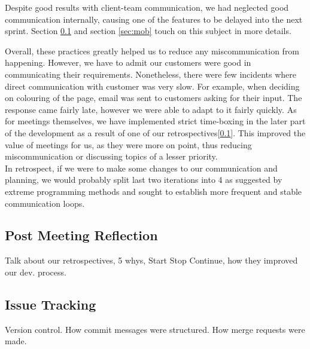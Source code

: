 \documentclass{l3proj}
\begin{document}
        \newline
        \newline
        Despite good results with client-team communication, we had neglected good communication internally, causing one of the features to be delayed into the next sprint. Section \ref{rec:retrospectives} and section \ref{sec:mob} touch on this subject in more details.
        
        \newline
        \newline
        Overall, these practices greatly helped us to reduce any miscommunication from happening. However, we have to admit  our customers were good in communicating their requirements. Nonetheless, there were few incidents where direct communication with customer was very slow. For example, when deciding on colouring of the page, email was sent to customers asking for their input. The response came fairly late, however we were able to adapt to it fairly quickly. As for meetings themselves, we have implemented strict time-boxing in the later part of the development as a result of one of our retrospectives[\ref{rec:retrospectives}]. This improved the value of meetings for us, as they were more on point, thus reducing miscommunication or discussing topics of a lesser priority.\\
        In retrospect, if we were to make some changes to our communication and planning, we would probably split last two iterations into 4 as suggested by extreme programming methods\cite{ep} and sought to establish more frequent and stable communication loops.
        
        
    \subsection{Post Meeting Reflection}
    \label{rec:retrospectives}
        Talk about our retrospectives, 5 whys, Start Stop Continue, how they improved our dev. process.
        
    \subsection{Issue Tracking}
    \label{sec:versio_control}
        Version control. How commit messages were structured. How merge requests were made.
        
\end{document}
